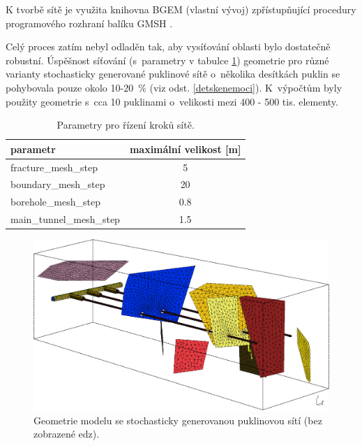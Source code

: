 \documentclass[11pt,a4paper]{article}
\newcommand{\pozn}[1]{(viz odst. \ref{#1})}
\begin{document}
\begin{onehalfspacing}
K tvorbě sítě je využita knihovna BGEM (vlastní vývoj) zpřístupňující procedury programového rozhraní balíku GMSH \cite{gmsh}. 

Celý proces zatím nebyl odladěn tak, aby vysíťování oblasti bylo dostatečně robustní. Úspěšnost síťování (s~parametry v tabulce \ref{kroky_site}) geometrie pro různé varianty stochasticky generované puklinové sítě o~několika desítkách puklin se pohybovala pouze okolo 10-20~\% \pozn{detskenemoci}. K~výpočtům byly použity geometrie s~cca 10 puklinami o~velikosti mezi 400 - 500 tis. elementy. 

\begin{table}[ht]
\begin{center}
    \caption{Parametry pro řízení kroků sítě.}
    \begin{tabular}{ | l | c |}
    \hline
    \small parametr & \small maximální velikost [m] \\ \hline
    \small fracture\_mesh\_step & \small 5 \\ \hline
    \small boundary\_mesh\_step & \small 20 \\ \hline
    \small borehole\_mesh\_step & \small 0.8 \\ \hline
    \small main\_tunnel\_mesh\_step & \small 1.5 \\ \hline
    \end{tabular}
    \label{kroky_site}
\end{center}
\end{table}
\vspace{-0.3cm}

\begin{figure}[H]
\centering
\includegraphics[width=16cm]{graphics/obr_ralek/geom02.png}
\caption{Geometrie modelu se stochasticky generovanou puklinovou sítí (bez zobrazené edz).}
\label{geom02}
\end{figure}


\end{onehalfspacing}
\end{document}

